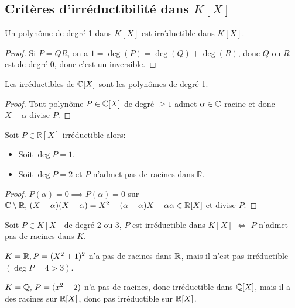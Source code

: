\subsection{Critères d'irréductibilité dans $K[X]$}

\begin{prop}
	Un polynôme de degré 1 dans $K[X]$ est irréductible dans $K[X]$.
\end{prop}

\begin{proof}
	Si $P = QR$, on a $ 1 = \deg(P) = \deg(Q) + \deg(R)$, donc $Q$ ou $R$ est de degré 0, donc c'est un inversible.
\end{proof}

\begin{theorem}
	Les irréductibles de $\mathbb{C}[X]$ sont les polynômes de degré 1.
\end{theorem}

\begin{proof}
	Tout polynôme $P\in \mathbb{C}[X]$ de degré $\geq 1$ admet $\alpha \in \mathbb{C}$ racine et donc $X-\alpha$ divise $P$.
\end{proof}

\begin{prop}
	Soit $P \in \mathbb{R}[X]$ irréductible alors:
	\begin{itemize}
		\item Soit $\deg P = 1$.
		\item Soit $\deg P = 2$ et $P$ n'admet pas de racines dans $\mathbb{R}$.
	\end{itemize}
\end{prop}

\begin{proof}
	$P(\alpha) = 0 \implies P(\bar{\alpha}) = 0$
	sur $\mathbb{C} \setminus \mathbb{R}, \, (X- \alpha) (X- \bar{\alpha}) = X ^2 - (\alpha + \bar{\alpha})X +
		\alpha\bar{\alpha} \in \mathbb{R}[X]$
	et divise $P$.
\end{proof}

\begin{prop}
	Soit $P \in K[X]$ de degré 2 ou 3,
	$P$ est irréductible dans $K[X]$ $\iff$ $P$ n'admet pas de racines dans $K$.
\end{prop}

\begin{example}
	$K = \mathbb{R}, P = (X^2 + 1 )^2$ n'a pas de racines dans $\mathbb{R}$, mais il n'est pas irréductible $(\deg P = 4 > 3)$.
\end{example}

\begin{example}
	$K = \mathbb{Q}, \,P = (x^2 - 2 )$ n'a pas de racines, donc irréductible dans $\mathbb{Q}[X]$, mais il a des racines sur $\mathbb{R}[X]$, donc pas irréductible sur $\mathbb{R}[X]$.
\end{example}

